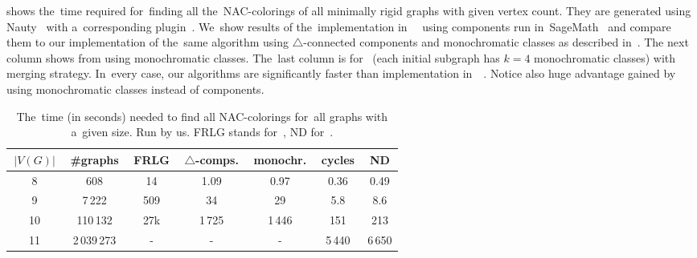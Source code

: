 shows the~time required for~finding all the~NAC-colorings
of all minimally rigid graphs with given vertex count.
%
They are generated using Nauty~\cite{nauty}
with a~corresponding plugin~\cite{nauty_plugin}.
%
We~show results of the~implementation
in~\flexrilog{}~\cite{flexrilog} using \trcon{} components
run in~SageMath~\cite{sagemath}
and compare them to our implementation of the~same \Naive{} algorithm
using $\triangle$-connected components
and monochromatic classes as described in~.
The next column shows \NaiveCycles{} from 
using monochromatic classes.
The~last column is for~\NeighborsDegree{} (each initial subgraph has $k=4$ monochromatic classes)
with \MergeLinear{} merging strategy.
%
In~every case, our algorithms are significantly faster than implementation in~\flexrilog{}~\cite{flexrilog}.
Notice also huge advantage gained by using monochromatic classes instead of \trcon{} components.
%
\begin{table}[ht]
	\caption[Running times on graphs]{
		The~time (in seconds) needed to find all NAC-colorings for~all graphs with a~given size. Run by us.
		\textsc{FRLG} stands for~\flexrilog{}, \textsc{ND} for~\NeighborsDegree{}.}%
	\label{tab:all_min_rigid}
	\centering
	\begin{tabular}{ccccccc}
		\hline
		\,$|V(G)|$\, & \,\#graphs\, & \,FRLG\, & \,$\triangle$-comps.\, & \,monochr.\, & \,cycles\, & \,\textsc{ND}\, \\
		\hline
		8            & 608          & 14       & 1.09                   & 0.97         & 0.36       & 0.49            \\
		9            & 7\,222       & 509      & 34                     & 29           & 5.8        & 8.6             \\
		10           & 110\,132     & 27k      & 1\,725                 & 1\,446       & 151        & 213             \\
		11           & 2\,039\,273  & -        & -                      & -            & 5\,440     & 6\,650          \\
		\hline
	\end{tabular}
\end{table}

